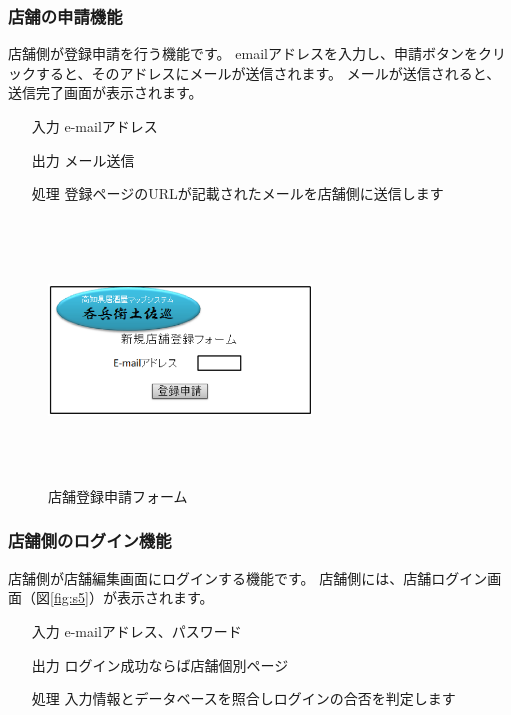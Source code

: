 \documentclass[a4j,titlepage]{jarticle}
\begin{document}
\subsubsection{店舗の申請機能}
店舗側が登録申請を行う機能です。
emailアドレスを入力し、申請ボタンをクリックすると、そのアドレスにメールが送信されます。
メールが送信されると、送信完了画面が表示されます。

\begin{enumerate}
\item[入力] e-mailアドレス
\item[出力] メール送信
\item[処理] 登録ページのURLが記載されたメールを店舗側に送信します
\end{enumerate}

\begin{figure}[htbp]
  \begin{center}
  \includegraphics [height=7cm, width=7cm]{extrnal1_design_document_image/s4.eps}
  \caption{店舗登録申請フォーム}
  \label {fig:s4}
  \end{center}
\end{figure}

\newpage
\subsubsection{店舗側のログイン機能}
店舗側が店舗編集画面にログインする機能です。
店舗側には、店舗ログイン画面（図\ref{fig:s5}）が表示されます。

\begin{enumerate}
\item[入力] e-mailアドレス、パスワード
\item[出力] ログイン成功ならば店舗個別ページ
\item[処理] 入力情報とデータベースを照合しログインの合否を判定します
\end{enumerate}
\end{document}
